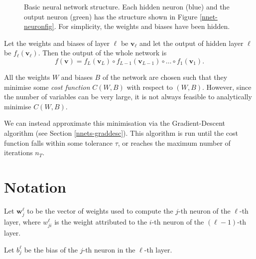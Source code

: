 \begin{figure}
\caption{Basic neural network structure. Each hidden neuron (blue) and the output neuron (green) has the structure shown in Figure \ref{nnet-neuronfig}. For simplicity, the weights and biases have been hidden.}
\label{nnet-structurefig}
\end{figure}

Let the weights and biases of layer $\ell$ be $\mathbf{v}_\ell$ and let the output of hidden layer $\ell$ be $f_\ell(\mathbf{v}_\ell)$. Then the output of the whole network is
\[
	f(\mathbf{v}) = f_L(\mathbf{v}_L) \circ f_{L-1}(\mathbf{v}_{L-1}) \circ \ldots \circ f_1(\mathbf{v}_1).
\]

All the weights $W$ and biases $B$ of the network are chosen such that they minimise some \textit{cost function} $C(W,B)$ with respect to $(W,B)$. However, since the number of variables can be very large, it is not always feasible to analytically minimise $C(W,B)$.

We can instead approximate this minimisation via the Gradient-Descent algorithm (see Section \ref{nnets-graddesc}). This algorithm is run until the cost function falls within some tolerance $\tau$, or reaches the maximum number of iterations $n_T$.

\section{Notation}\label{nnets-not}


Let $\mathbf{w}^\ell_j$ to be the vector of weights used to compute the $j$-th neuron of the $\ell$-th layer, where $w_{ji}^\ell$ is the weight attributed to the $i$-th neuron of the $(\ell-1)$-th layer.

Let $b_j^\ell$ be the bias of the $j$-th neuron in the $\ell$-th layer.


